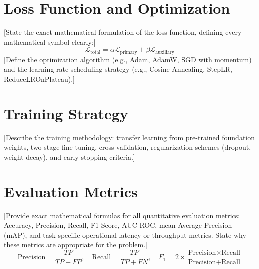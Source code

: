\section{Loss Function and Optimization}
[State the exact mathematical formulation of the loss function, defining every mathematical symbol clearly:]
\begin{equation}
    \mathcal{L}_{\text{total}} = \alpha \mathcal{L}_{\text{primary}} + \beta \mathcal{L}_{\text{auxiliary}}
\end{equation}
[Define the optimization algorithm (e.g., Adam, AdamW, SGD with momentum) and the learning rate scheduling strategy (e.g., Cosine Annealing, StepLR, ReduceLROnPlateau).]

\section{Training Strategy}
[Describe the training methodology: transfer learning from pre-trained foundation weights, two-stage fine-tuning, cross-validation, regularization schemes (dropout, weight decay), and early stopping criteria.]

\section{Evaluation Metrics}
[Provide exact mathematical formulas for all quantitative evaluation metrics: Accuracy, Precision, Recall, F1-Score, AUC-ROC, mean Average Precision (mAP), and task-specific operational latency or throughput metrics. State why these metrics are appropriate for the problem.]
\begin{equation}
    \text{Precision} = \frac{TP}{TP + FP}, \quad \text{Recall} = \frac{TP}{TP + FN}, \quad F_1 = 2 \times \frac{\text{Precision} \times \text{Recall}}{\text{Precision} + \text{Recall}}
\end{equation}
